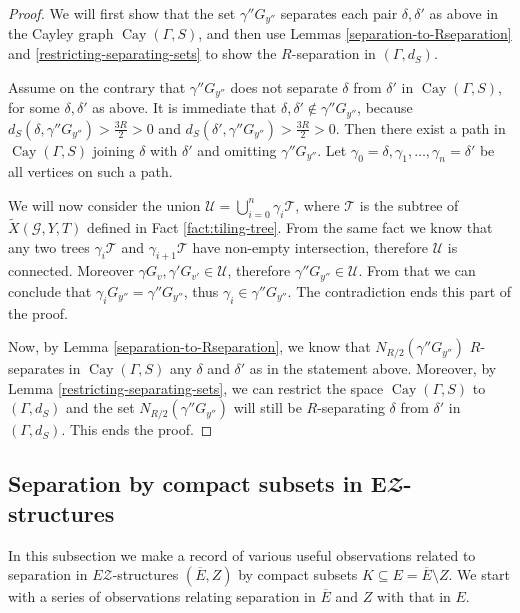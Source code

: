 \documentclass[12pt, a4paper]{article}
\newcommand{\8}{\infty}
\DeclareMathOperator{\Cay}{Cay}
\theoremstyle{break}
\theoremstyle{defbreak}
\newcommand{\ol}[1]{\overline{#1}}
\newcommand{\wtl}[1]{\widetilde{#1}}
\begin{document}
\begin{proof}
    We will first show that the set $\gamma''G_{y''}$ separates each pair $\delta,\delta'$ as above in the Cayley graph $\Cay(\Gamma,S)$, and then use Lemmas \ref{separation-to-Rseparation} and \ref{restricting-separating-sets} to show the $R$-separation in $(\Gamma,d_S)$.

    Assume on the contrary that $\gamma''G_{y''}$ does not separate $\delta$ from $\delta'$ in  $\Cay(\Gamma,S)$, for some $\delta,\delta'$ as above. It is immediate that $\delta, \delta'\not\in \gamma''G_{y''}$, because $d_S(\delta,\gamma''G_{y''}) > \frac{3R}{2} > 0$ and $d_S(\delta',\gamma''G_{y''}) > \frac{3R}{2} > 0$. Then there exist a path in $\Cay(\Gamma,S)$ joining $\delta$ with $\delta'$
    and omitting $\gamma''G_{y''}$. Let $\gamma_0=\delta, \gamma_1, \ldots, \gamma_n = \delta'$ be all vertices on such a path.
    
    We will now consider the union $\mathcal{U} = \bigcup_{i=0}^n \gamma_i\mathcal{T}$, where $\mathcal{T}$ is the subtree of $\wtl{X}(\mathcal{G},Y,T)$ defined in Fact \ref{fact:tiling-tree}. From the same fact we know that any two trees $\gamma_i\mathcal{T}$ and $\gamma_{i+1}\mathcal{T}$ have non-empty intersection, therefore $\mathcal{U}$ is connected. Moreover $\gamma G_v, \gamma'G_{v'}\in \mathcal{U}$, therefore $\gamma''G_{y''} \in \mathcal{U}$. From that we can conclude that $\gamma_iG_{y''} = \gamma''G_{y''}$, thus $\gamma_i\in \gamma''G_{y''}$. The contradiction ends this part of the proof.

    Now, by Lemma \ref{separation-to-Rseparation}, we know that $N_{R/2}(\gamma''G_{y''})$ $R$-separates in $\Cay(\Gamma,S)$
    any $\delta$ and $\delta'$
    as in the statement above. Moreover, by Lemma \ref{restricting-separating-sets}, we can restrict the space $\Cay(\Gamma,S)$ to $(\Gamma,d_S)$ and the set $N_{R/2}(\gamma''G_{y''})$ will still be $R$-separating $\delta$ from $\delta'$ in $(\Gamma,d_S)$. This ends the proof.
\end{proof}


\subsection{Separation by compact subsets in \texorpdfstring{$\mathbf{E}\mathbfcal{Z}$}{EZ}-structures} \label{Subsection:separation_in_EZ}

In this subsection we make a record of various useful observations  related to separation in $E\mathcal{Z}$-structures $(\ol E,Z)$ by compact subsets $K\subseteq E=\ol E\setminus Z$. We start with a series of observations
relating separation in $\ol E$ and $Z$ with that in $E$.\medskip
\end{document}
